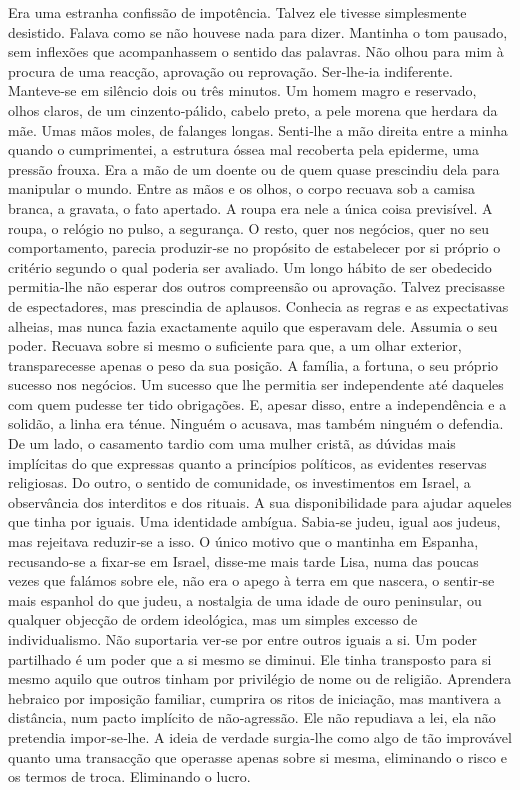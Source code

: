 Era uma estranha confissão de impotência. Talvez ele tivesse
simplesmente desistido. Falava como se não houvese nada para dizer.
Mantinha o tom pausado, sem inflexões que acompanhassem o sentido das
palavras. Não olhou para mim à procura de uma reacção, aprovação ou
reprovação. Ser­‑lhe­‑ia indiferente. Manteve­‑se em silêncio dois ou
três minutos. Um homem magro e reservado, olhos claros, de um
cinzento­‑pálido, cabelo preto, a pele morena que herdara da mãe. Umas
mãos moles, de falanges longas. Senti­‑lhe a mão direita entre a minha
quando o cumprimentei, a estrutura óssea mal recoberta pela epiderme,
uma pressão frouxa. Era a mão de um doente ou de quem quase prescindiu
dela para manipular o mundo. Entre as mãos e os olhos, o corpo recuava
sob a camisa branca, a gravata, o fato apertado. A roupa era nele a
única coisa previsível. A roupa, o relógio no pulso, a segurança. O
resto, quer nos negócios, quer no seu comportamento, parecia
produzir­‑se no propósito de estabelecer por si próprio o critério
segundo o qual poderia ser avaliado. Um longo hábito de ser obedecido
permitia­‑lhe não esperar dos outros compreensão ou aprovação. Talvez
precisasse de espectadores, mas prescindia de aplausos. Conhecia as
regras e as expectativas alheias, mas nunca fazia exactamente aquilo que
esperavam dele. Assumia o seu poder. Recuava sobre si mesmo o suficiente
para que, a um olhar exterior, transparecesse apenas o peso da sua
posição. A família, a fortuna, o seu próprio sucesso nos negócios. Um
sucesso que lhe permitia ser independente até daqueles com quem pudesse
ter tido obrigações. E, apesar disso, entre a independência e a solidão,
a linha era ténue. Ninguém o acusava, mas também ninguém o defendia. De
um lado, o casamento tardio com uma mulher cristã, as dúvidas mais
implícitas do que expressas quanto a princípios políticos, as evidentes
reservas religiosas. Do outro, o sentido de comunidade, os investimentos
em Israel, a observância dos interditos e dos rituais. A sua
disponibilidade para ajudar aqueles que tinha por iguais. Uma identidade
ambígua. Sabia­‑se judeu, igual aos judeus, mas rejeitava reduzir­‑se a
isso. O único motivo que o mantinha em Espanha, recusando­‑se a
fixar­‑se em Israel, disse­‑me mais tarde Lisa, numa das poucas vezes
que falámos sobre ele, não era o apego à terra em que nascera, o
sentir­‑se mais espanhol do que judeu, a nostalgia de uma idade de ouro
peninsular, ou qualquer objecção de ordem ideológica, mas um simples
excesso de individualismo. Não suportaria ver­‑se por entre outros
iguais a si. Um poder partilhado é um poder que a si mesmo se diminui.
Ele tinha transposto para si mesmo aquilo que outros tinham por
privilégio de nome ou de religião. Aprendera hebraico por imposição
familiar, cumprira os ritos de iniciação, mas mantivera a distância, num
pacto implícito de não­‑agressão. Ele não repudiava a lei, ela não
pretendia impor­‑se­‑lhe. A ideia de verdade surgia­‑lhe como algo de
tão improvável quanto uma transacção que operasse apenas sobre si mesma,
eliminando o risco e os termos de troca. Eliminando o lucro.

